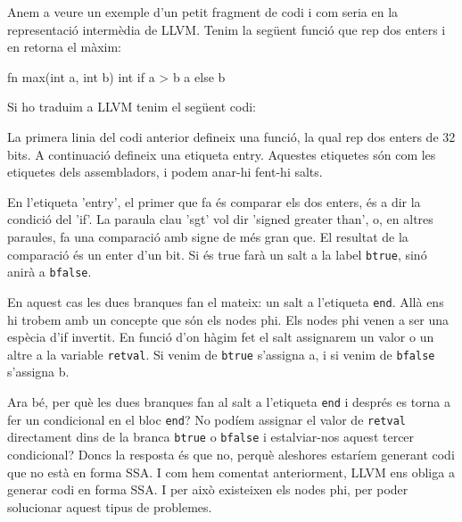 ﻿\documentclass{article}
\begin{document}
Anem a veure un exemple d'un petit fragment de codi i com seria en la
representació intermèdia de LLVM. Tenim la següent funció  que rep dos enters i
en retorna el màxim:

\begin{code}
fn max(int a, int b) int {
    if a > b { a } else { b }
}
\end{code}

Si ho traduim a LLVM tenim el següent codi:


La primera linia del codi anterior defineix una funció, la qual rep dos enters
de 32 bits. A continuació defineix una etiqueta entry. Aquestes etiquetes són
com les etiquetes dels assembladors, i podem anar-hi fent-hi salts.

En l'etiqueta 'entry', el primer que fa és comparar els dos enters, és a dir la
condició del 'if'. La paraula clau 'sgt' vol dir 'signed greater than', o, en
altres paraules, fa una comparació amb signe de més gran que. El resultat de la
comparació és un enter d'un bit. Si és true farà un salt a la label
\texttt{btrue}, sinó anirà a \texttt{bfalse}. 

En aquest cas les dues branques fan el mateix: un salt a l'etiqueta
\texttt{end}. Allà ens hi trobem amb un concepte que són els nodes phi. Els 
nodes phi venen a ser una espècia d'if invertit. En funció d'on hàgim fet el 
salt assignarem un valor o un altre a la variable \texttt{retval}. Si venim de
\texttt{btrue} s'assigna a, i si venim de \texttt{bfalse} s'assigna b.

Ara bé, per què les dues branques fan al salt a l'etiqueta \texttt{end} i
després es torna a fer un condicional en el bloc \texttt{end}? No podíem
assignar el valor de \texttt{retval} directament dins de la branca
\texttt{btrue} o \texttt{bfalse} i estalviar-nos aquest tercer condicional?
Doncs la resposta és que no, perquè aleshores estaríem generant codi que no està
en forma SSA. I com hem comentat anteriorment, LLVM ens obliga a generar codi en
forma SSA. I per això existeixen els nodes phi, per poder solucionar aquest
tipus de problemes.
\end{document}
